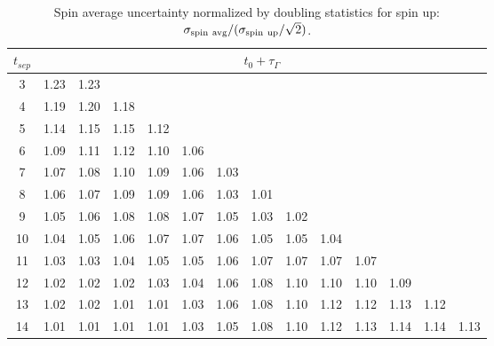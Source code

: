 \documentclass[prd,11pt,tightenlines,preprintnumbers,showpacs,superscriptaddress,notitlepage,nofootinbib,eqsecnum,floatfix,longbibliography]{revtex4-1}
\begin{document}
\begin{table}
\begin{ruledtabular}
\begin{tabular}{c|ccccccccccccc}
$t_{sep}$& \multicolumn{13}{c}{$t_0 + \tau_\Gamma$}\\
\hline
3 &1.23 &1.23\\
4 &1.19 &1.20 &1.18\\
5 &1.14 &1.15 &1.15 &1.12\\
6 &1.09 &1.11 &1.12 &1.10 &1.06\\
7 &1.07 &1.08 &1.10 &1.09 &1.06 &1.03\\
8 &1.06 &1.07 &1.09 &1.09 &1.06 &1.03 &1.01\\
9 &1.05 &1.06 &1.08 &1.08 &1.07 &1.05 &1.03 &1.02\\
10 &1.04 &1.05 &1.06 &1.07 &1.07 &1.06 &1.05 &1.05 &1.04\\
11 &1.03 &1.03 &1.04 &1.05 &1.05 &1.06 &1.07 &1.07 &1.07 &1.07\\
12 &1.02 &1.02 &1.02 &1.03 &1.04 &1.06 &1.08 &1.10 &1.10 &1.10 &1.09\\
13 &1.02 &1.02 &1.01 &1.01 &1.03 &1.06 &1.08 &1.10 &1.12 &1.12 &1.13 &1.12\\
14 &1.01 &1.01 &1.01 &1.01 &1.03 &1.05 &1.08 &1.10 &1.12 &1.13 &1.14 &1.14 &1.13\\
\end{tabular}
\end{ruledtabular}
\caption{\label{tab:spin_uncertainty}
Spin average uncertainty normalized by doubling statistics for spin up: $\sigma_{\rm spin\ avg} / (\sigma_{\rm spin\ up} / \sqrt{2})$.
}
\end{table}








\end{document}
